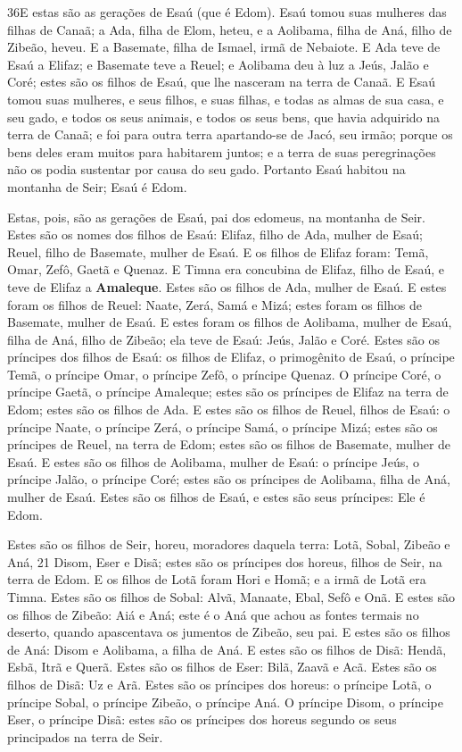 \smallskip

\lettrine{36} E estas são as gerações de Esaú (que é Edom).
Esaú tomou suas mulheres das filhas de Canaã; a Ada, filha de
Elom, heteu, e a Aolibama, filha de Aná, filho de Zibeão, heveu.
E a Basemate, filha de Ismael, irmã de Nebaiote. E Ada teve
de Esaú a Elifaz; e Basemate teve a Reuel; e Aolibama deu à luz
a Jeús, Jalão e Coré; estes são os filhos de Esaú, que lhe nasceram
na terra de Canaã. E Esaú tomou suas mulheres, e seus filhos, e
suas filhas, e todas as almas de sua casa, e seu gado, e todos os
seus animais, e todos os seus bens, que havia adquirido na terra de
Canaã; e foi para outra terra apartando-se de Jacó, seu irmão;
porque os bens deles eram muitos para habitarem juntos; e a
terra de suas peregrinações não os podia sustentar por causa do seu
gado. Portanto Esaú habitou na montanha de Seir; Esaú é Edom.

Estas, pois, são as gerações de Esaú, pai dos edomeus, na montanha
de Seir. Estes são os nomes dos filhos de Esaú: Elifaz, filho
de Ada, mulher de Esaú; Reuel, filho de Basemate, mulher de Esaú.
E os filhos de Elifaz foram: Temã, Omar, Zefô, Gaetã e
Quenaz. E Timna era concubina de Elifaz, filho de Esaú, e
teve de Elifaz a \textbf{Amaleque}. Estes são os filhos de Ada,
mulher de Esaú. E estes foram os filhos de Reuel: Naate,
Zerá, Samá e Mizá; estes foram os filhos de Basemate, mulher de
Esaú. E estes foram os filhos de Aolibama, mulher de Esaú,
filha de Aná, filho de Zibeão; ela teve de Esaú: Jeús, Jalão e Coré.
Estes são os príncipes dos filhos de Esaú: os filhos de
Elifaz, o primogênito de Esaú, o príncipe Temã, o príncipe Omar, o
príncipe Zefô, o príncipe Quenaz. O príncipe Coré, o príncipe
Gaetã, o príncipe Amaleque; estes são os príncipes de Elifaz na
terra de Edom; estes são os filhos de Ada. E estes são os
filhos de Reuel, filhos de Esaú: o príncipe Naate, o príncipe Zerá,
o príncipe Samá, o príncipe Mizá; estes são os príncipes de Reuel,
na terra de Edom; estes são os filhos de Basemate, mulher de Esaú.
E estes são os filhos de Aolibama, mulher de Esaú: o príncipe
Jeús, o príncipe Jalão, o príncipe Coré; estes são os príncipes de
Aolibama, filha de Aná, mulher de Esaú. Estes são os filhos
de Esaú, e estes são seus príncipes: Ele é Edom.

Estes são os filhos de Seir, horeu, moradores daquela terra:
Lotã, Sobal, Zibeão e Aná, 21 Disom, Eser e Disã; estes são os
príncipes dos horeus, filhos de Seir, na terra de Edom. E os
filhos de Lotã foram Hori e Homã; e a irmã de Lotã era Timna.
Estes são os filhos de Sobal: Alvã, Manaate, Ebal, Sefô e
Onã. E estes são os filhos de Zibeão: Aiá e Aná; este é o Aná
que achou as fontes termais no deserto, quando apascentava os
jumentos de Zibeão, seu pai. E estes são os filhos de Aná:
Disom e Aolibama, a filha de Aná. E estes são os filhos de
Disã: Hendã, Esbã, Itrã e Querã. Estes são os filhos de Eser:
Bilã, Zaavã e Acã. Estes são os filhos de Disã: Uz e Arã.
Estes são os príncipes dos horeus: o príncipe Lotã, o
príncipe Sobal, o príncipe Zibeão, o príncipe Aná. O príncipe
Disom, o príncipe Eser, o príncipe Disã: estes são os príncipes dos
horeus segundo os seus principados na terra de Seir.

